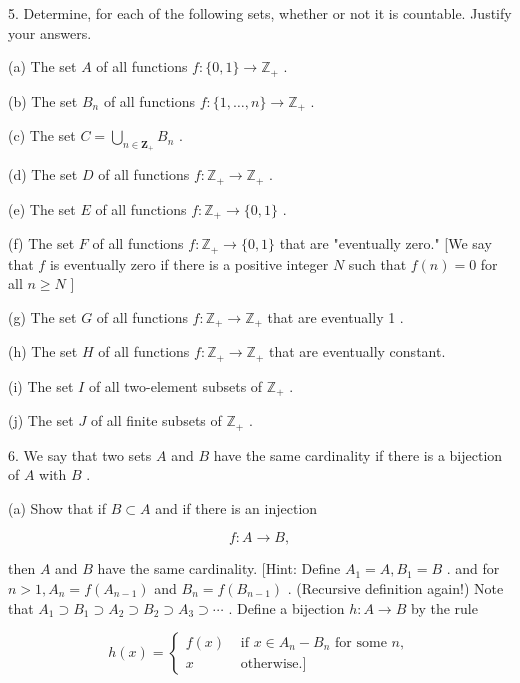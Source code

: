 5. Determine, for each of the following sets, whether or not it is countable. Justify your answers.

(a) The set \(A\) of all functions \(f : \{ 0,1\}  \rightarrow  {\mathbb{Z}}_{ + }\) .

(b) The set \({B}_{n}\) of all functions \(f : \{ 1,\ldots ,n\}  \rightarrow  {\mathbb{Z}}_{ + }\) .

(c) The set \(C = \mathop{\bigcup }\limits_{{n \in  {\mathbf{Z}}_{ + }}}{B}_{n}\) .

(d) The set \(D\) of all functions \(f : {\mathbb{Z}}_{ + } \rightarrow  {\mathbb{Z}}_{ + }\) .

(e) The set \(E\) of all functions \(f : {\mathbb{Z}}_{ + } \rightarrow  \{ 0,1\}\) .

(f) The set \(F\) of all functions \(f : {\mathbb{Z}}_{ + } \rightarrow  \{ 0,1\}\) that are "eventually zero." [We say that \(f\) is eventually zero if there is a positive integer \(N\) such that \(f\left( n\right)  = 0\) for all \(n \geq  N\) ]

(g) The set \(G\) of all functions \(f : {\mathbb{Z}}_{ + } \rightarrow  {\mathbb{Z}}_{ + }\) that are eventually 1 .

(h) The set \(H\) of all functions \(f : {\mathbb{Z}}_{ + } \rightarrow  {\mathbb{Z}}_{ + }\) that are eventually constant.

(i) The set \(I\) of all two-element subsets of \({\mathbb{Z}}_{ + }\) .

(j) The set \(J\) of all finite subsets of \({\mathbb{Z}}_{ + }\) .

6. We say that two sets \(A\) and \(B\) have the same cardinality if there is a bijection of \(A\) with \(B\) .

(a) Show that if \(B \subset  A\) and if there is an injection

\[
f : A \rightarrow  B,
\]

then \(A\) and \(B\) have the same cardinality. [Hint: Define \({A}_{1} = A,{B}_{1} = B\) . and for \(n > 1,{A}_{n} = f\left( {A}_{n - 1}\right)\) and \({B}_{n} = f\left( {B}_{n - 1}\right)\) . (Recursive definition again!) Note that \({A}_{1} \supset  {B}_{1} \supset  {A}_{2} \supset  {B}_{2} \supset  {A}_{3} \supset  \cdots\) . Define a bijection \(h : A \rightarrow  B\) by the rule

\[
h\left( x\right)  = \left\{  \begin{array}{ll} f\left( x\right) & \text{ if }x \in  {A}_{n} - {B}_{n}\text{ for some }n, \\  x & \text{ otherwise.] } \end{array}\right.
\]

